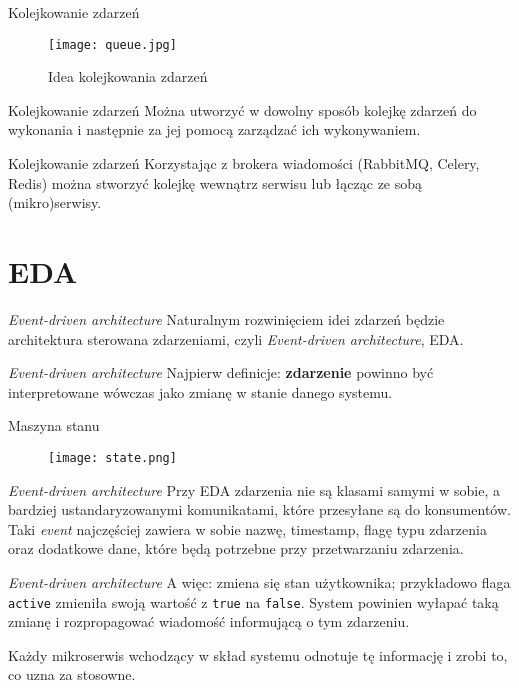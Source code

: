 \begin{frame}{Kolejkowanie zdarzeń}
	\begin{figure}[t]
		\centering
		\texttt{[image: queue.jpg]}
		\caption{Idea kolejkowania zdarzeń}
	\end{figure}
\end{frame}

\begin{frame}{Kolejkowanie zdarzeń}
	Można utworzyć w dowolny sposób kolejkę zdarzeń do wykonania i następnie za jej pomocą zarządzać ich wykonywaniem. 
\end{frame}

\begin{frame}{Kolejkowanie zdarzeń}
	Korzystając z brokera wiadomości (RabbitMQ, Celery, Redis) można stworzyć kolejkę wewnątrz serwisu lub łącząc ze sobą (mikro)serwisy.
\end{frame}

\section{EDA}

\begin{frame}{\emph{Event-driven architecture}}
	Naturalnym rozwinięciem idei zdarzeń będzie architektura sterowana zdarzeniami, czyli \emph{Event-driven architecture}, EDA.
\end{frame}

\begin{frame}{\emph{Event-driven architecture}}
	Najpierw definicje: \textbf{zdarzenie} powinno być interpretowane wówczas jako zmianę w stanie danego systemu.
\end{frame}

\begin{frame}{Maszyna stanu}
	\begin{figure}[t]
		\centering
		\texttt{[image: state.png]}
	\end{figure}
\end{frame}

\begin{frame}{\emph{Event-driven architecture}}
	Przy EDA zdarzenia nie są klasami samymi w sobie, a bardziej ustandaryzowanymi komunikatami, które przesyłane są do konsumentów. Taki \emph{event} najczęściej zawiera w sobie nazwę, timestamp, flagę typu zdarzenia oraz dodatkowe dane, które będą potrzebne przy przetwarzaniu zdarzenia.
\end{frame}

\begin{frame}{\emph{Event-driven architecture}}
	A więc: zmiena się stan użytkownika; przykładowo flaga \texttt{active} zmieniła swoją wartość z \texttt{true} na \texttt{false}. System powinien wyłapać taką zmianę i rozpropagować wiadomość informującą o tym zdarzeniu.
	
	Każdy mikroserwis wchodzący w skład systemu odnotuje tę informację i zrobi to, co uzna za stosowne. 
\end{frame}

